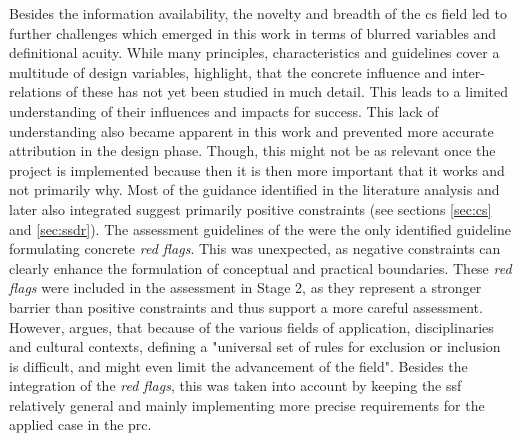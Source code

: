Besides the information availability, the novelty and breadth of the \acrshort{cs} field led to further challenges which emerged in this work in terms of blurred variables and definitional acuity. While many principles, characteristics and guidelines cover a multitude of design variables, \autocite{kirschkeCitizenScienceProjects2022} highlight, that the concrete influence and inter-relations of these has not yet been studied in much detail. This leads to a limited understanding of their influences and impacts for success. This lack of understanding also became apparent in this work and prevented more accurate attribution in the design phase. Though, this might not be as relevant once the project is implemented because then it is then more important that it works and not primarily why.\newline
Most of the guidance identified in the literature analysis and later also integrated suggest primarily positive constraints  (see sections \ref{sec:cs} and \ref{sec:ssdr}). The assessment guidelines of the \autocite{ifrcCommunityBasedSurveillanceGuiding2017} were the only identified guideline formulating concrete \textit{red flags}. This was unexpected, as negative constraints can clearly enhance the formulation of conceptual and practical boundaries. These \textit{red flags} were included in the assessment in Stage 2, as they represent a stronger barrier than positive constraints and thus support a more careful assessment. However, \autocite[1]{escaECSACharacteristicsCitizen2020} argues, that because of the various fields of application, disciplinaries and cultural contexts, defining a "universal set of rules for exclusion or inclusion is difficult, and might even limit the advancement of the field". Besides the integration of the \textit{red flags}, this was taken into account by keeping the \acrshort{ssf} relatively general and mainly implementing more precise requirements for the applied case in the \acrshort{prc}.\newline

